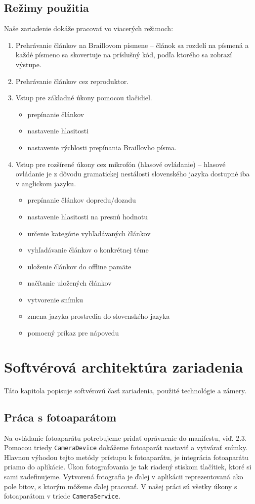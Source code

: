 \documentclass{template/socthesis}
\begin{document}
\section{Režimy použitia}
Naše zariadenie dokáže pracovať	 vo viacerých režimoch:
\begin{enumerate}
\item Prehrávanie článkov na Braillovom písmene -- článok sa rozdelí na písmená a každé písmeno sa skovertuje na príslušný kód, podľa ktorého sa zobrazí výstupe.
\item Prehrávanie článkov cez reproduktor.
\item Vstup pre základné úkony pomocou tlačidiel. 
\begin{itemize}
\item prepínanie článkov
\item nastavenie hlasitosti
\item nastavenie rýchlosti prepínania Braillovho písma.
\end{itemize}
\item Vstup pre rozšírené úkony cez mikrofón (hlasové ovládanie) -- hlasové ovládanie je z dôvodu gramatickej nestálosti slovenského jazyka dostupné iba v anglickom jazyku.
\begin{itemize}
\item prepínanie článkov dopredu/dozadu
\item nastavenie hlasitosti na presnú hodnotu
\item určenie kategórie vyhľadávaných článkov 
\item vyhľadávanie článkov o konkrétnej téme
\item uloženie článkov do offline pamäte
\item načítanie uložených článkov
\item vytvorenie snímku
\item zmena jazyka prostredia do slovenského jazyka
\item pomocný príkaz pre nápovedu
\end{itemize}
\end{enumerate}

\chapter{Softvérová architektúra zariadenia}
Táto kapitola popisuje softvérovú časť zariadenia, použité technológie a zámery.

\section*{Práca s fotoaparátom}
Na ovládanie fotoaparátu potrebujeme pridať oprávnenie do manifestu, viď. 2.3.  Pomocou triedy \texttt{CameraDevice} dokážeme fotoaparát nastaviť a vytvárať snímky. Hlavnou výhodou tejto metódy prístupu k fotoaparátu, je integrácia fotoaparátu priamo do aplikácie. Úkon fotografovania je tak riadený stiskom tlačítiek, ktoré si sami zadefinujeme. Vytvorená fotografia je ďalej v aplikácii reprezentovaná ako pole bitov, s ktorým môžeme ďalej pracovať. V našej práci sú všetky úkony s fotoaparátom v triede \texttt{CameraService}.
\end{document}
